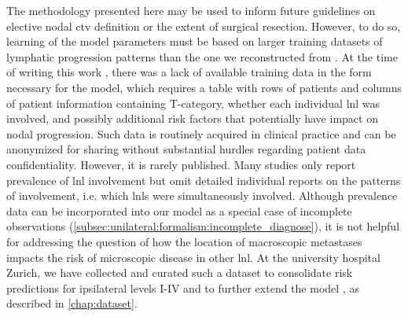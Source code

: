 \documentclass[\relativeRoot/main.tex]{subfiles}
\begin{document}
The methodology presented here may be used to inform future guidelines on elective nodal \gls{ctv} definition or the extent of surgical resection. However, to do so, learning of the model parameters must be based on larger training datasets of lymphatic progression patterns than the one we reconstructed from \cite{sanguineti_defining_2009}. At the time of writing this work \cite{ludwig_hidden_2021}, there was a lack of available training data in the form necessary for the model, which requires a table with rows of patients and columns of patient information containing T-category, whether each individual \gls{lnl} was involved, and possibly additional risk factors that potentially have impact on nodal progression. Such data is routinely acquired in clinical practice and can be anonymized for sharing without substantial hurdles regarding patient data confidentiality. However, it is rarely published. Many studies only report prevalence of \gls{lnl} involvement \cite{lindberg_distribution_1972,woolgar_histological_1999,candela_patterns_1990,vauterin_patterns_2006,ho_patterns_2012,shah_patterns_1990,razfar_incidence_2009,woolgar_topography_2007,chung_pattern_2016} but omit detailed individual reports on the patterns of involvement, i.e. which \glspl{lnl} were simultaneously involved. Although prevalence data can be incorporated into our model as a special case of incomplete observations (\cref{subsec:unilateral:formalism:incomplete_diagnose}), it is not helpful for addressing the question of how the location of macroscopic metastases impacts the risk of microscopic disease in other \gls{lnl}. At the university hospital Zurich, we have collected and curated such a dataset to consolidate risk predictions for ipsilateral levels I-IV and to further extend the model \cite{ludwig_detailed_2021,ludwig_dataset_2021}, as described in \cref{chap:dataset}.
\end{document}
